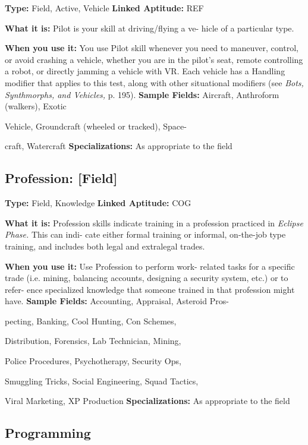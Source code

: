 \textbf{Type: }Field, Active, Vehicle
\textbf{Linked Aptitude:} REF

\textbf{What it is:} Pilot is your skill at driving/flying a ve-
hicle of a particular type.

\textbf{When you use it:} You use Pilot skill whenever you 
need to maneuver, control, or avoid crashing a vehicle, 
whether you are in the pilot's seat, remote controlling 
a robot, or directly jamming a vehicle with VR. Each 
vehicle has a Handling modifier that applies to this 
test, along with other situational modifiers (see \textit{Bots, }
\textit{Synthmorphs, and Vehicles,} p. 195).
\textbf{Sample Fields:} Aircraft, Anthroform (walkers), Exotic 

Vehicle, Groundcraft (wheeled or tracked), Space-

craft, Watercraft
\textbf{Specializations:} As appropriate to the field

\subsection{Profession: [Field]}

\textbf{Type:} Field, Knowledge
\textbf{Linked Aptitude:} COG

\textbf{What it is:} Profession skills indicate training in a 
profession practiced in \textit{Eclipse Phase.} This can indi-
cate either formal training or informal, on-the-job type 
training, and includes both legal and extralegal trades.

\textbf{When you use it:} Use Profession to perform work-
related tasks for a specific trade (i.e. mining, balancing 
accounts, designing a security system, etc.) or to refer-
ence specialized knowledge that someone trained in 
that profession might have.
\textbf{Sample Fields:} Accounting, Appraisal, Asteroid Pros-

pecting, Banking, Cool Hunting, Con Schemes, 

Distribution, Forensics, Lab Technician, Mining, 

Police Procedures, Psychotherapy, Security Ops, 

Smuggling Tricks, Social Engineering, Squad Tactics, 

Viral Marketing, XP Production
\textbf{Specializations:} As appropriate to the field

\subsection{Programming}

